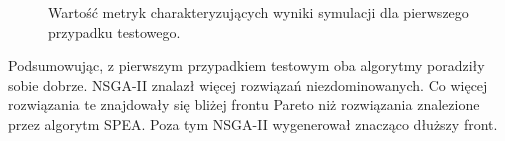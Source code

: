 \documentclass[twoside]{iisthesis}
\begin{document}
\begin{figure}\centering
{}
    \hfill
{}

    \hfill
{}
\caption{Wartość metryk charakteryzujących wyniki symulacji dla pierwszego przypadku testowego.}
    \label{fig:small_metrics}
\end{figure}
Podsumowując, z pierwszym przypadkiem testowym oba algorytmy poradziły sobie dobrze. NSGA-II znalazł więcej rozwiązań niezdominowanych. Co więcej rozwiązania te znajdowały się bliżej frontu Pareto niż rozwiązania znalezione przez algorytm SPEA. Poza tym NSGA-II wygenerował znacząco dłuższy front.
\end{document}
